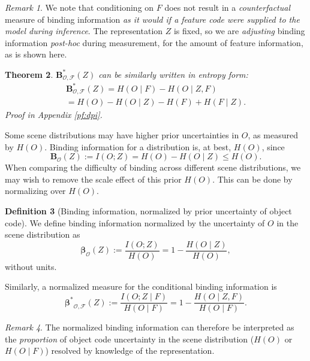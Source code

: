 \documentclass{article}
\theoremstyle{plain}
\newtheorem{theorem}{Theorem}[section]
\theoremstyle{definition}
\newtheorem{definition}[theorem]{Definition}
\theoremstyle{remark}
\newtheorem{remark}[theorem]{Remark}
\begin{document}
\begin{remark}
    We note that conditioning on $F$ does not result in a \textit{counterfactual} measure of binding information \textit{as it would if a feature code were supplied to the model during inference}. The representation $Z$ is fixed, so we are \textit{adjusting} binding information \textit{post-hoc} during measurement, for the amount of feature information, as is shown here.
\end{remark}
\begin{theorem}
    $\mathbf{B}_{\mathcal{O, F}}^{*}(Z)$ can be similarly written in entropy form:
    \begin{equation}
            \begin{gathered}
         \mathbf{B}_{\mathcal{O, F}}^{*}(Z)=H(O\mid F)-H(O \mid Z, F )\\=H(O)-H(O\mid Z)-H(F)+H(F\mid Z).
    \end{gathered}
    \label{bindingcondexpanded}
        \end{equation}
Proof in Appendix \ref{pf:dpi}.
\label{bindcondeq}  
\end{theorem}

Some scene distributions may have higher prior uncertainties in $O$, as measured by $H(O)$. Binding information for a distribution is, at best, $H(O)$, since \[\mathbf{B}_{\mathcal{O}}(Z):=I(O;Z)=H(O)-H(O\mid Z)\leq H(O).\] When comparing the difficulty of binding across different scene distributions, we may wish to remove the scale effect of this prior $H(O)$. This can be done by normalizing over $H(O)$.

\begin{definition}[Binding information, normalized by prior uncertainty of object code] We define binding information normalized by the uncertainty of $O$ in the scene distribution as 
    \[
    \mathbf{\beta}_{\mathcal{O}}(Z):= \frac{I(O;Z)}{H(O)}=1-\frac{H(O\mid Z)}{H(O)},
    \]
without units.

Similarly, a normalized measure for the conditional binding information is
\[
    \mathbf{\beta^*}_{\mathcal{O, F}}(Z):= \frac{I(O;Z\mid F)}{H(O\mid F)}=1-\frac{H(O\mid Z, F)}{H(O\mid F)}.
\]\label{norm}
\end{definition}

\begin{remark}
    The normalized binding information can therefore be interpreted as the \textit{proportion} of object code uncertainty in the scene distribution ($H(O)$ or $H(O\mid F)$) resolved by knowledge of the representation. 
\end{remark}
\end{document}
